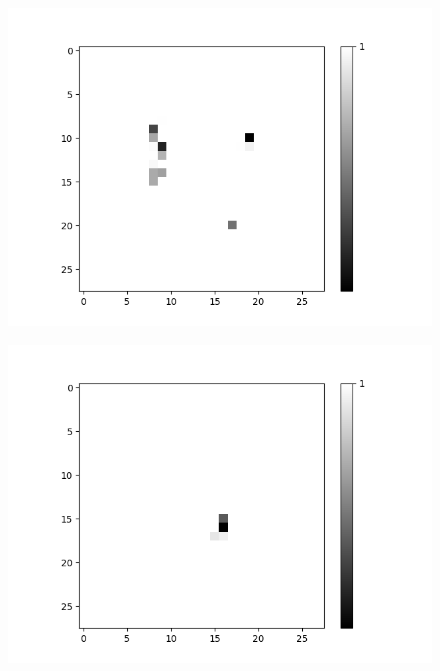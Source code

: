 \begin{figure}[H]
	\captionsetup{labelformat=empty}
	\centering
	\begin{minipage}[b]{0.19\textwidth}
		\includegraphics[width=\textwidth]{LoAE(AND)(20LF)/True/Feature-0.png}
		\label{}
	\end{minipage}
	\begin{minipage}[b]{0.19\textwidth}
		\includegraphics[width=\textwidth]{LoAE(AND)(20LF)/True/Feature-4.png}
		\label{}
	\end{minipage}
	\begin{minipage}[b]{0.19\textwidth}

\end{minipage}
\end{figure}
